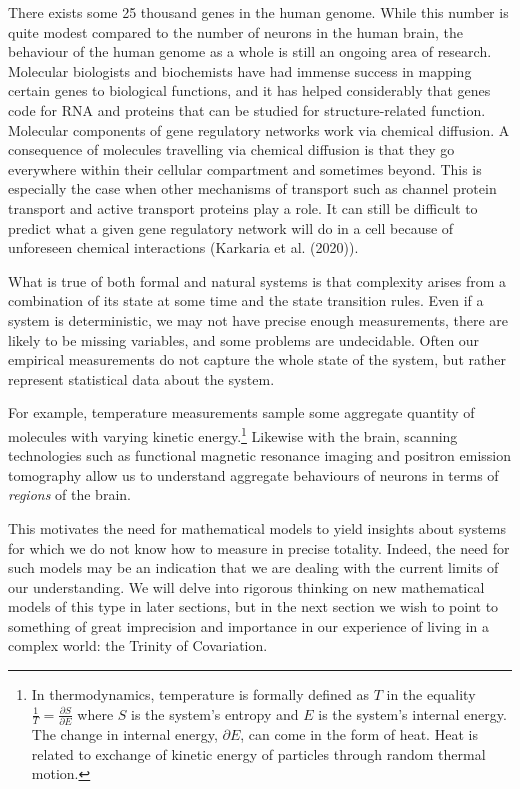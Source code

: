\documentclass[
  letterpaper,
  DIV=11,
  numbers=noendperiod]{scrreprt}
\begin{document}
There exists some 25 thousand genes in the human genome. While this
number is quite modest compared to the number of neurons in the human
brain, the behaviour of the human genome as a whole is still an ongoing
area of research. Molecular biologists and biochemists have had immense
success in mapping certain genes to biological functions, and it has
helped considerably that genes code for RNA and proteins that can be
studied for structure-related function. Molecular components of gene
regulatory networks work via chemical diffusion. A consequence of
molecules travelling via chemical diffusion is that they go everywhere
within their cellular compartment and sometimes beyond. This is
especially the case when other mechanisms of transport such as channel
protein transport and active transport proteins play a role. It can
still be difficult to predict what a given gene regulatory network will
do in a cell because of unforeseen chemical interactions (Karkaria et
al. (2020)).

What is true of both formal and natural systems is that complexity
arises from a combination of its state at some time and the state
transition rules. Even if a system is deterministic, we may not have
precise enough measurements, there are likely to be missing variables,
and some problems are undecidable. Often our empirical measurements do
not capture the whole state of the system, but rather represent
statistical data about the system.

For example, temperature measurements sample some aggregate quantity of
molecules with varying kinetic
energy.\footnote{In thermodynamics, temperature is formally defined as $T$ in the equality $\frac{1}{T} = \frac{\partial S}{\partial E}$ where $S$ is the system's entropy and $E$ is the system's internal energy. The change in internal energy, $\partial E$, can come in the form of heat. Heat is related to exchange of kinetic energy of particles through random thermal motion.}
Likewise with the brain, scanning technologies such as functional
magnetic resonance imaging and positron emission tomography allow us to
understand aggregate behaviours of neurons in terms of \emph{regions} of
the brain.

This motivates the need for mathematical models to yield insights about
systems for which we do not know how to measure in precise totality.
Indeed, the need for such models may be an indication that we are
dealing with the current limits of our understanding. We will delve into
rigorous thinking on new mathematical models of this type in later
sections, but in the next section we wish to point to something of great
imprecision and importance in our experience of living in a complex
world: the Trinity of Covariation.
\end{document}
